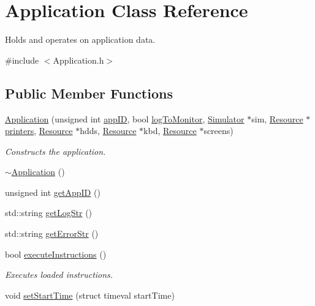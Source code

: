 \hypertarget{class_application}{}\section{Application Class Reference}
\label{class_application}


Holds and operates on application data.  




{\ttfamily \#include $<$Application.\+h$>$}

\subsection*{Public Member Functions}
\begin{DoxyCompactItemize}
\item 
\hyperlink{class_application_a1e27f766c7406acc8b558d9ae9833532}{Application} (unsigned int \hyperlink{class_application_ab60884b656840152d696b93a272ed2b0}{app\+ID}, bool \hyperlink{class_application_a3ace413063712e18aa3865ce2bb9cf15}{log\+To\+Monitor}, \hyperlink{class_simulator}{Simulator} $\ast$sim, \hyperlink{class_resource}{Resource} $\ast$\hyperlink{class_application_ad36f40feace83b72030e43a91a67fdd7}{printers}, \hyperlink{class_resource}{Resource} $\ast$hdds, \hyperlink{class_resource}{Resource} $\ast$kbd, \hyperlink{class_resource}{Resource} $\ast$screens)
\begin{DoxyCompactList}\small\item\em Constructs the application. \end{DoxyCompactList}\item 
\hyperlink{class_application_a748bca84fefb9c12661cfaa2f623748d}{$\sim$\+Application} ()
\item 
unsigned int \hyperlink{class_application_a3865334b425d0129d6e8bff18af4538c}{get\+App\+ID} ()
\item 
std\+::string \hyperlink{class_application_a66dc20ae5dc8c57d09cc4696ded5469a}{get\+Log\+Str} ()
\item 
std\+::string \hyperlink{class_application_a355bf7238b12a83427a08908b9fcd922}{get\+Error\+Str} ()
\item 
bool \hyperlink{class_application_adf6ddd24f1f16bf82e5951bf3309093b}{execute\+Instructions} ()
\begin{DoxyCompactList}\small\item\em Executes loaded instructions. \end{DoxyCompactList}\item 
void \hyperlink{class_application_ab8c8aabf4ae8ba4d9b7e87066c43f9b9}{set\+Start\+Time} (struct timeval start\+Time)
\end{DoxyCompactItemize}
